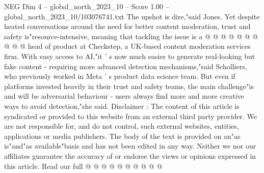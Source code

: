 \begin{textsample}{NEG Dim 4 – global\_north\_2023\_10 – Score 1.00 – global\_north\_2023\_10/103076741.txt}
The upshot is dire,"said Jones.
Yet despite heated conversations around the need for better content moderation, trust and safety is"resource-intensive, meaning that tackling the issue is a @ @ @ @ @ @ @ @ @ @ head of product at Checkstep, a UK-based content moderation services firm.
With easy access to AI,"it ' s now much easier to generate real-looking but fake content - requiring more advanced detection mechanisms,"said Scholliers, who previously worked in Meta ' s product data science team.
But even if platforms invested heavily in their trust and safety teams, the main challenge"is and will be adversarial behaviour - users always find more and more creative ways to avoid detection,"she said.
Disclaimer : The content of this article is syndicated or provided to this website from an external third party provider.
We are not responsible for, and do not control, such external websites, entities, applications or media publishers.
The body of the text is provided on an"as is"and"as available"basis and has not been edited in any way.
Neither we nor our affiliates guarantee the accuracy of or endorse the views or opinions expressed in this article.
Read our full @ @ @ @ @ @ @ @ @ @

\end{textsample}
